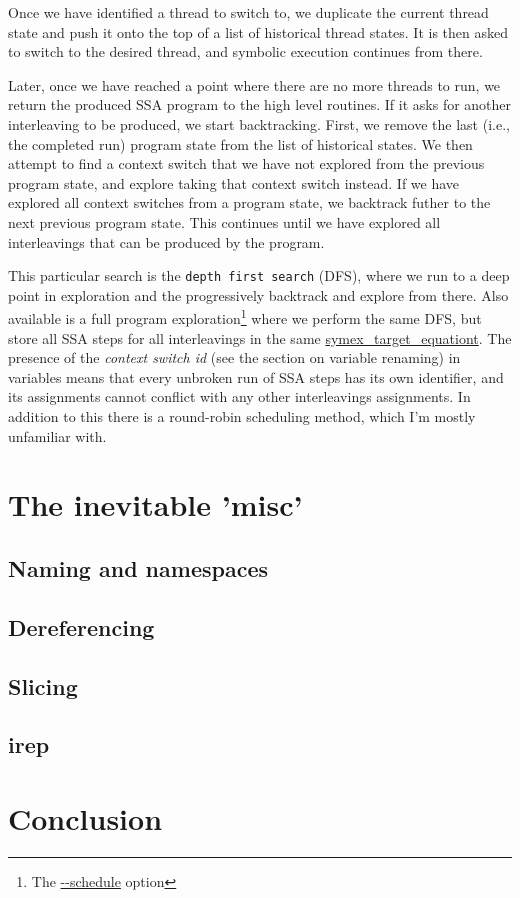 \documentclass{article}
\begin{document}
Once we have identified a thread to switch to, we duplicate the current thread
state and push it onto the top of a list of historical thread states. It is
then asked to switch to the desired thread, and symbolic execution continues
from there.

Later, once we have reached a point where there are no more threads to run,
we return the produced SSA program to the high level routines. If it asks
for another interleaving to be produced, we start backtracking. First, we remove
the last (i.e., the completed run) program state from the list of historical
states. We then attempt to find a context switch that we have not explored
from the previous program state, and explore taking that context switch instead.
If we have explored all context switches from a program state, we backtrack
futher to the next previous program state. This continues until we have explored
all interleavings that can be produced by the program.

This particular search is the \texttt{depth first search} (DFS), where we run to
a deep point in exploration and the progressively backtrack and explore from
there. Also available is a full program exploration\footnote{The
\url{--schedule} option} where we perform the same DFS, but store all SSA steps
for all interleavings in the same \url{symex_target_equationt}. The presence
of the \textit{context switch id} (see the section on variable renaming) in
variables means that every unbroken run of SSA steps has its own identifier,
and its assignments cannot conflict with any other interleavings assignments.
In addition to this there is a round-robin scheduling method, which I'm mostly
unfamiliar with.

\section{The inevitable 'misc'}
\subsection{Naming and namespaces}
\subsection{Dereferencing}
\subsection{Slicing}
\subsection{irep}
\section{Conclusion}
\end{document}
